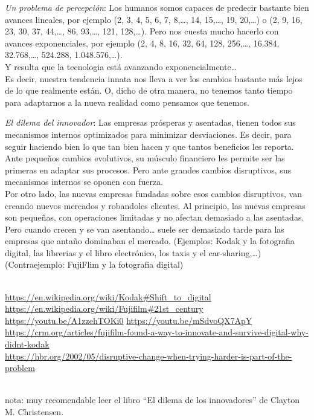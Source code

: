 \documentclass[spanish,12pt,a4paper,final,oneside]{book}
\begin{document}
\vspace{0.5cm}

\textit{Un problema de percepción}: Los humanos somos capaces de predecir bastante bien avances lineales, por ejemplo (2, 3, 4, 5, 6, 7, 8,\ldots, 14, 15,\ldots, 19, 20,\ldots) o (2, 9, 16, 23, 30, 37, 44,\ldots, 86, 93,\ldots, 121, 128,\ldots). Pero nos cuesta mucho hacerlo con avances exponenciales, por ejemplo (2, 4, 8, 16, 32, 64, 128, 256,\ldots, 16.384, 32.768,\ldots, 524.288, 1.048.576,\ldots).
\\Y resulta que la tecnologia está avanzando exponencialmente\ldots
\\Es decir, nuestra tendencia innata nos lleva a ver los cambios bastante más lejos de lo que realmente están. O, dicho de otra manera, no tenemos tanto tiempo para adaptarnos a la nueva realidad como pensamos que tenemos.

\vspace{0.5cm}

\textit{El dilema del innovador}: \label{ElDilemaDelInnovador} Las empresas prósperas y asentadas, tienen todos sus mecanismos internos optimizados para minimizar desviaciones. Es decir, para seguir haciendo bien lo que tan bien hacen y que tantos beneficios les reporta. Ante pequeños cambios evolutivos, su músculo financiero les permite ser las primeras en adaptar sus procesos. Pero ante grandes cambios disruptivos, sus mecanismos internos se oponen con fuerza. 
\\Por otro lado, las nuevas empresas fundadas sobre esos cambios disruptivos, van creando nuevos mercados y robandoles clientes. Al principio, las nuevas empresas son pequeñas, con operaciones limitadas y no afectan demasiado a las asentadas. Pero cuando crecen y se van asentando… suele ser demasiado tarde para las empresas que antaño dominaban el mercado. (Ejemplos: Kodak y la fotografia digital, las librerias y el libro electrónico, los taxis y el car-sharing,\ldots) (Contraejemplo: FujiFlim y la fotografia digital)
\begin{small}
\\ \url{https://en.wikipedia.org/wiki/Kodak#Shift_to_digital}
\\ \url{https://en.wikipedia.org/wiki/Fujifilm#21st_century}
\\ \url{https://youtu.be/A1zzehTOKi0} \hspace{1cm} \url{https://youtu.be/mSdvoQX7ApY}
\\ \url{https://crm.org/articles/fujifilm-found-a-way-to-innovate-and-survive-digital-why-didnt-kodak}
\\ \url{https://hbr.org/2002/05/disruptive-change-when-trying-harder-is-part-of-the-problem}
\end{small}
\\ nota: muy recomendable leer el libro ``El dilema de los innovadores'' de Clayton M. Christensen.
\end{document}

